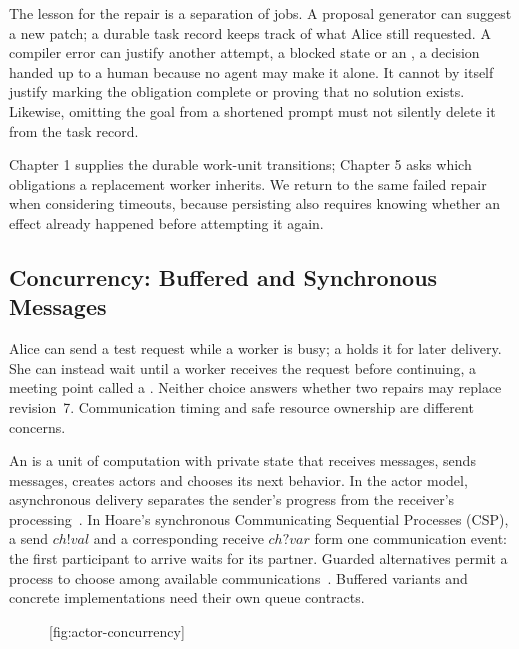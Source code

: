 The lesson for the repair is a separation of jobs. A proposal generator can suggest
a new patch; a durable task record keeps track of what Alice still requested.
A compiler error can justify another attempt, a blocked state or an
, a decision handed up to a human because no agent may make
it alone.
It cannot by itself justify marking the obligation complete or proving that
no solution exists. Likewise, omitting the goal from a shortened prompt must
not silently delete it from the task record.

Chapter 1 supplies the durable work-unit transitions; Chapter 5 asks which
obligations a replacement worker inherits. We return to the same failed repair
when considering timeouts, because persisting also requires knowing whether an
effect already happened before attempting it again.


\subsection{Concurrency: Buffered and Synchronous Messages}
Alice can send a test request while a worker is busy; a  holds
it for later delivery. She can instead wait until a worker receives the request
before continuing, a meeting point called a . Neither choice answers whether two repairs may replace revision~7.
Communication timing and safe resource ownership are different concerns.

An  is a unit of computation with private state that receives
messages, sends messages, creates actors and chooses its next behavior.
In the actor model, asynchronous delivery separates the sender's progress from the receiver's
processing~. In Hoare's synchronous
Communicating Sequential Processes (CSP),
a send $\mathit{ch}!\mathit{val}$ and a corresponding receive $\mathit{ch}?\mathit{var}$ form one communication event:
the first participant to arrive waits for its partner. Guarded alternatives
permit a process to choose among available communications~.
Buffered variants and concrete implementations need their own queue contracts.

\begin{figure}[tp]
  \centering
  [fig:actor-concurrency]
\end{figure}

